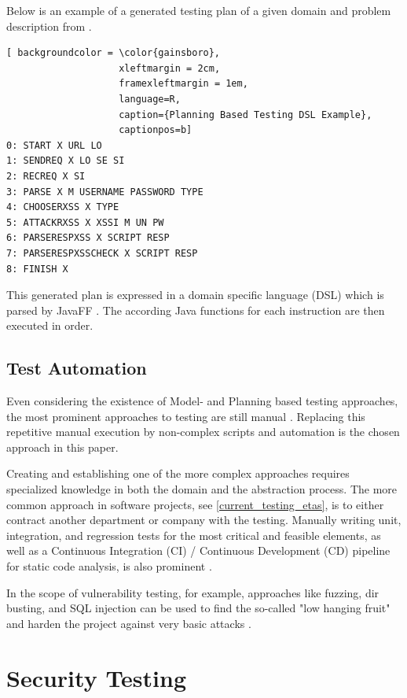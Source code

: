 Below is an example of a generated testing plan of a given domain and problem description from \citep{wotawa2014}.

\begin{lstlisting}[ backgroundcolor = \color{gainsboro}, 
                    xleftmargin = 2cm, 
                    framexleftmargin = 1em, 
                    language=R,
                    caption={Planning Based Testing DSL Example},
                    captionpos=b]
0: START X URL LO
1: SENDREQ X LO SE SI
2: RECREQ X SI
3: PARSE X M USERNAME PASSWORD TYPE 
4: CHOOSERXSS X TYPE
5: ATTACKRXSS X XSSI M UN PW
6: PARSERESPXSS X SCRIPT RESP
7: PARSERESPXSSCHECK X SCRIPT RESP 
8: FINISH X
\end{lstlisting}

This generated plan is expressed in a domain specific language (DSL) which is parsed by JavaFF \citep{javaffColes}. The according Java functions for each instruction are then executed in order.

\subsection{Test Automation}
Even considering the existence of Model- and Planning based testing approaches, the most prominent approaches to testing are still manual \citep{secTestingSurvey2016}.
Replacing this repetitive manual execution by non-complex scripts and automation is the chosen approach in this paper.

Creating and establishing one of the more complex approaches requires specialized knowledge in both the domain and the abstraction process. The more common approach in software projects, see \ref{current_testing_etas}, is to either contract another department or company with the testing. Manually writing unit, integration, and regression tests for the most critical and feasible elements, as well as a Continuous Integration (CI) / Continuous Development (CD) pipeline for static code analysis, is also prominent \citep{secTestingSurvey2016}.

In the scope of vulnerability testing, for example, approaches like fuzzing, dir busting, and SQL injection can be used to find the so-called "low hanging fruit" and harden the project against very basic attacks \citep{autoPentestOverview2018}.

\newpage

\section{Security Testing}
